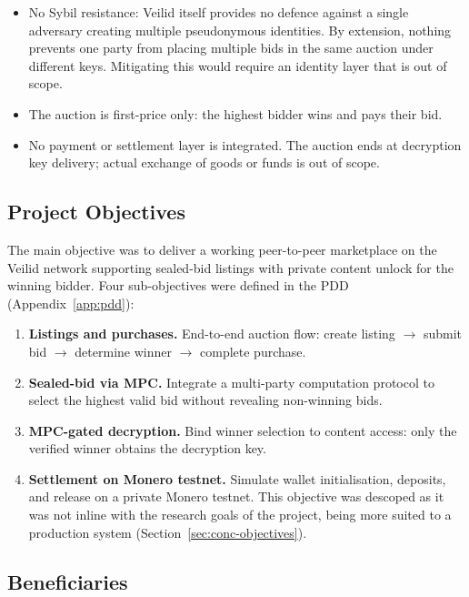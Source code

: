 \begin{itemize}[noitemsep]
    can target specific parties for corruption
    (Section~\ref{sec:results-security}).
  \item No Sybil resistance: Veilid itself provides no defence against
    a single adversary creating multiple pseudonymous identities.  By
    extension, nothing prevents one party from placing multiple bids in
    the same auction under different keys.  Mitigating this would require
    an identity layer that is out of scope.
  \item The auction is first-price only: the highest bidder wins and pays
    their bid. 
  \item No payment or settlement layer is integrated.  The auction ends
    at decryption key delivery; actual exchange of goods or funds is
    out of scope.
\end{itemize}

\subsection{Project Objectives}
\label{sec:intro-objectives}

The main objective was to deliver a working peer-to-peer marketplace on the
Veilid network supporting sealed-bid listings with private content unlock for
the winning bidder.  Four sub-objectives were defined in the PDD
(Appendix~\ref{app:pdd}):

\begin{enumerate}
  \item \textbf{Listings and purchases.}  End-to-end auction flow: create
    listing $\rightarrow$ submit bid $\rightarrow$ determine winner
    $\rightarrow$ complete purchase.
  \item \textbf{Sealed-bid via MPC.}  Integrate a multi-party computation
    protocol to select the highest valid bid without revealing non-winning bids.
  \item \textbf{MPC-gated decryption.}  Bind winner selection to content
    access: only the verified winner obtains the decryption key.
  \item \textbf{Settlement on Monero testnet.}  Simulate wallet
    initialisation, deposits, and release on a private Monero testnet.
    This objective was descoped as it was not inline with the research
    goals of the project, being more suited to a production system
    (Section~\ref{sec:conc-objectives}).
\end{enumerate}

\subsection{Beneficiaries}
\label{sec:intro-beneficiaries}

